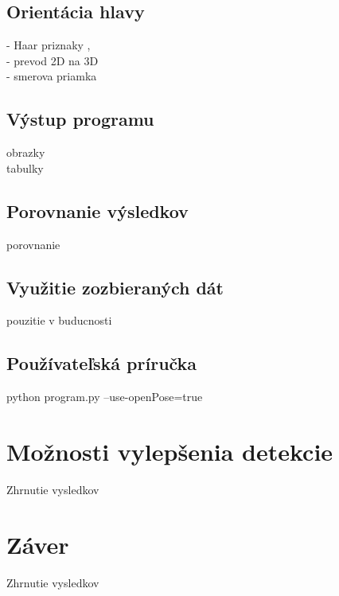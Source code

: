 \documentclass[slovak,master,dept460,male,cpp,cpdeclaration]{diploma}
\begin{document}
\newpage
\subsection{Orientácia hlavy}
- Haar  priznaky ,\\
- prevod 2D na 3D \\
- smerova priamka

\newpage
\subsection{Výstup programu}
obrazky\\
tabulky

\newpage
\subsection{Porovnanie výsledkov}
porovnanie


\newpage
\subsection{Využitie zozbieraných dát}
pouzitie v buducnosti


\newpage
\subsection{Používateľská príručka}
python program.py --use-openPose=true


\newpage
\section{Možnosti vylepšenia detekcie}
\label{sec:Možnosti vylepšenia detekcie}
Zhrnutie vysledkov


\newpage
\section{Záver}
\label{sec:Zaver}
Zhrnutie vysledkov








\end{document}
